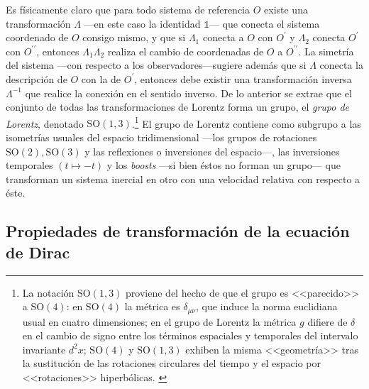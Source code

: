 Es físicamente claro que para todo sistema de referencia $O$ existe una transformación $\Lambda$ ---en este caso la identidad $\mathbb{1}$--- que conecta el sistema coordenado de $O$ consigo mismo, y que si $\Lambda_1$ conecta a $O$ con $O^\prime$ y $\Lambda_2$ conecta $O^\prime$ con $O^{\prime\prime}$, entonces $\Lambda_1 \Lambda_2$ realiza el cambio de coordenadas de $O$ a $O^{\prime \prime}$. La simetría del sistema ---con respecto a los observadores---sugiere además que si $\Lambda$ conecta la descripción de $O$ con la de $O^\prime$, entonces debe existir una transformación inversa $\Lambda^{-1}$ que realice la conexión en el sentido inverso. De lo anterior se extrae que el conjunto de todas las transformaciones de Lorentz forma un grupo, el \textit{grupo de Lorentz}, denotado $\text{SO}(1,3)$.\footnote{La notación $\text{SO}(1,3)$ proviene del hecho de que el grupo es <<parecido>> a $\text{SO}(4)$: en $\text{SO}(4)$ la métrica es $\delta_{\mu \nu}$, que induce la norma euclidiana usual en cuatro dimensiones; en el grupo de Lorentz la métrica $g$ difiere de $\delta$ en el cambio de signo entre los términos espaciales y temporales del intervalo invariante $d^2 x $; $\text{SO}(4)$ y $\text{SO}(1,3)$ exhiben la misma <<geometría>> tras la sustitución de las rotaciones circulares del tiempo y el espacio por <<rotaciones>> hiperbólicas. \citep{RobinsonSymmetry}} El grupo de Lorentz contiene como subgrupo a las isometrías usuales del espacio tridimensional ---los grupos de rotaciones $\text{SO}(2), \text{SO}(3)$ y las reflexiones o inversiones del espacio---, las inversiones temporales $(t\mapsto -t)$ y los \textit{boosts} ---si bien éstos no forman un grupo--- que transforman un sistema inercial en otro con una velocidad relativa con respecto a éste.\footnotemark


\subsection{Propiedades de transformación de la ecuación de Dirac}
\label{subsec:PropTransEcDirac}

